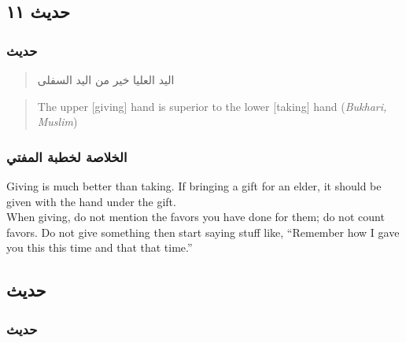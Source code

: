 \documentclass[
]{book}
\begin{document}
\hypertarget{ux62dux62fux64aux62b-ux661ux661}{%
\subsection{حديث ١١}\label{ux62dux62fux64aux62b-ux661ux661}}

\hypertarget{ux62dux62fux64aux62b-10}{%
\subsubsection{حديث}\label{ux62dux62fux64aux62b-10}}

\begin{quote}
اليد العليا خير من اليد السفلى
\end{quote}

\begin{quote}
The upper {[}giving{]} hand is superior to the lower {[}taking{]} hand (\emph{Bukhari, Muslim})
\end{quote}

\hypertarget{ux627ux644ux62eux644ux627ux635ux629-ux644ux62eux637ux628ux629-ux627ux644ux645ux641ux62aux64a-10}{%
\subsubsection{الخلاصة لخطبة المفتي}\label{ux627ux644ux62eux644ux627ux635ux629-ux644ux62eux637ux628ux629-ux627ux644ux645ux641ux62aux64a-10}}

Giving is much better than taking. If bringing a gift for an elder, it should be given with the hand under the gift.\\
When giving, do not mention the favors you have done for them; do not count favors. Do not give something then start saying stuff like, ``Remember how I gave you this this time and that that time.''

\hypertarget{ux62dux62fux64aux62b-11}{%
\subsection{حديث}\label{ux62dux62fux64aux62b-11}}

\hypertarget{ux62dux62fux64aux62b-12}{%
\subsubsection{حديث}\label{ux62dux62fux64aux62b-12}}

\begin{quote}
\end{quote}
\end{document}
